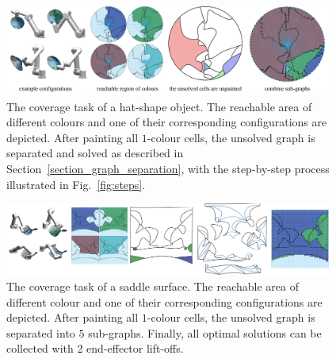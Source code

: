 \documentclass[journal]{IEEEtran}
\begin{document}
\begin{figure}[t]
\centering
\includegraphics[width=0.96\textwidth]{figures/hat_exp/fig_hat_3}
\caption{The coverage task of a hat-shape object. The reachable area of different colours and one of their corresponding configurations are depicted. After painting all $1$-colour cells, the unsolved graph is %
separated and solved as described in Section~\ref{section_graph_separation}, with the step-by-step process illustrated in Fig.~\ref{fig:steps}. } 
\label{fig:hat}
\end{figure}
\begin{figure}[t]
\centering
\includegraphics[width=0.96\textwidth]{figures/saddle_exp/comb_2}
\caption{The coverage task of a saddle surface. The reachable area of different colour and one of their corresponding configurations are depicted. After painting all $1$-colour cells, the unsolved graph is separated into $5$ sub-graphs. Finally, all optimal solutions can be collected with 2 end-effector lift-offs.}
\label{fig:saddle}
\end{figure}
\end{document}
